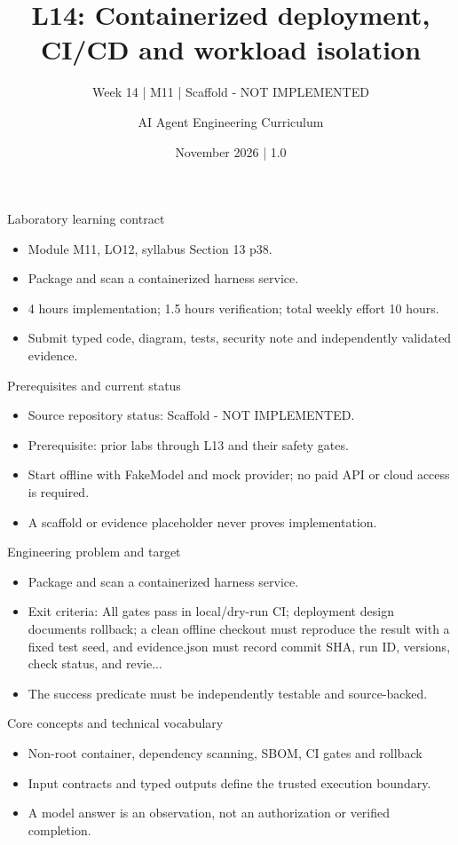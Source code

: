 \documentclass[aspectratio=169,10pt]{beamer}
\title[L14 - Agent Engineering]{L14: Containerized deployment, CI/CD and workload isolation}
\subtitle{Week 14 | M11 | Scaffold - NOT IMPLEMENTED}
\author{AI Agent Engineering Curriculum}
\date{November 2026 | 1.0}
\begin{document}
\begin{frame}\titlepage\end{frame}

\begin{frame}{Laboratory learning contract}
\small
\begin{itemize}
\item Module M11, LO12, syllabus Section 13 p38.
\item Package and scan a containerized harness service.
\item 4 hours implementation; 1.5 hours verification; total weekly effort 10 hours.
\item Submit typed code, diagram, tests, security note and independently validated evidence.
\end{itemize}

\end{frame}

\begin{frame}{Prerequisites and current status}
\small
\begin{itemize}
\item Source repository status: Scaffold - NOT IMPLEMENTED.
\item Prerequisite: prior labs through L13 and their safety gates.
\item Start offline with FakeModel and mock provider; no paid API or cloud access is required.
\item A scaffold or evidence placeholder never proves implementation.
\end{itemize}

\end{frame}

\begin{frame}{Engineering problem and target}
\small
\begin{itemize}
\item Package and scan a containerized harness service.
\item Exit criteria: All gates pass in local/dry-run CI; deployment design documents rollback; a clean offline checkout must reproduce the result with a fixed test seed, and evidence.json must record commit SHA, run ID, versions, check status, and revie...
\item The success predicate must be independently testable and source-backed.
\end{itemize}

\end{frame}

\begin{frame}{Core concepts and technical vocabulary}
\small
\begin{itemize}
\item Non-root container, dependency scanning, SBOM, CI gates and rollback
\item Input contracts and typed outputs define the trusted execution boundary.
\item A model answer is an observation, not an authorization or verified completion.
\end{itemize}

\end{frame}
\end{document}

